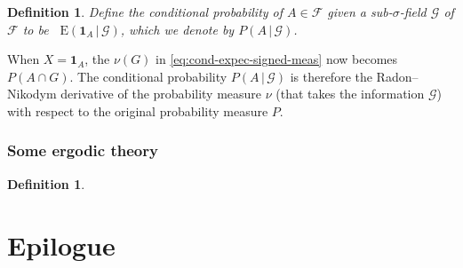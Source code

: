 \documentclass[10pt]{article}
\numberwithin{equation}{section}
\theoremstyle{plain-star}
\theoremstyle{definition-star}
\newtheorem{defn}[equation]{Definition}
\theoremstyle{remark-star}
\theoremstyle{plain-star}
\newcommand{\ind}{\mathbf{1}}
\newcommand{\E}{\mathop{}\!\mathrm{E}}
\newcommand{\giv}{\,|\,}
\newcommand{\F}{\mathcal{F}}
\newcommand{\G}{\mathcal{G}}
\begin{document}

\begin{defn}
    Define the conditional probability of $A \in \F$ given a sub-$\sigma$-field $\G$ of $\F$ to be $\E(\ind_A \giv \G)$, which we denote by $P(A\giv \G)$.
\end{defn}

When $X = \ind_A$, the $\nu(G)$ in \eqref{eq:cond-expec-signed-meas} now becomes $P(A\cap G)$. The conditional probability $P(A \giv \G)$ is therefore the Radon--Nikodym derivative of the probability measure $\nu$ (that takes the information $\G$) with respect to the original probability measure $P$.

\section{Some ergodic theory}
\begin{defn}
    
\end{defn}

\newpage
{}
{}
\part*{\Large Epilogue}

\newpage
{}
\printbibliography

\newpage
{}
{}
\printindex
\end{document}
